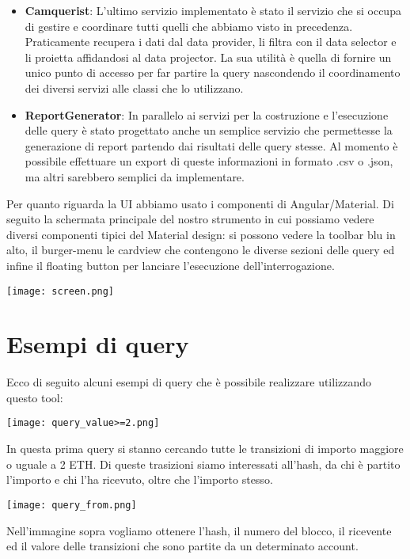 \begin{itemize}
    \item {\bfseries Camquerist}:
    L'ultimo servizio implementato è stato il servizio che si occupa di gestire e coordinare tutti quelli che abbiamo visto in precedenza.
    Praticamente recupera i dati dal data provider, li filtra con il data selector e li proietta affidandosi al data projector.
    La sua utilità è quella di fornire un unico punto di accesso per far partire la query nascondendo il coordinamento dei diversi servizi alle classi che lo utilizzano.

    \item {\bfseries ReportGenerator}:
    In parallelo ai servizi per la costruzione e l'esecuzione delle query è stato progettato anche un semplice servizio che permettesse la generazione di report partendo dai risultati delle query stesse.
    Al momento è possibile effettuare un export di queste informazioni in formato .csv o .json, ma altri sarebbero semplici da implementare.

\end{itemize}

Per quanto riguarda la UI abbiamo usato i componenti di Angular/Material.
Di seguito la schermata principale del nostro strumento in cui possiamo vedere diversi componenti tipici del Material design:
si possono vedere la toolbar blu in alto, il burger-menu le cardview che contengono le diverse sezioni delle query ed infine il floating button per lanciare l'esecuzione dell'interrogazione.

\begin{center}
    \texttt{[image: screen.png]}
\end{center}


\section{Esempi di query}
Ecco di seguito alcuni esempi di query che è possibile realizzare utilizzando questo tool:
\begin{center}
  \texttt{[image: query\_value>=2.png]}
\end{center}
In questa prima query si stanno cercando tutte le transizioni di importo maggiore o uguale a 2 ETH.
Di queste trasizioni siamo interessati all'hash, da chi è partito l'importo e chi l'ha ricevuto, oltre che l'importo stesso.

\begin{center}
  \texttt{[image: query\_from.png]}
\end{center}
Nell'immagine sopra vogliamo ottenere l'hash, il numero del blocco, il ricevente ed il valore delle transizioni che sono partite da un determinato account.

